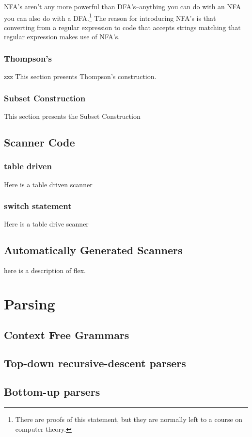 \documentclass[letterpaper,12pt,openany,reqno]{book}%
\begin{document}
NFA's aren't any more powerful than DFA's--anything you can do with an NFA you can also do with a DFA.\footnote{There are proofs of this statement, but they are normally left to a course on computer theory.} The reason for introducing NFA's is that converting from a regular expression to code that accepts strings matching that regular expression makes use of NFA's.

\section{Thompson's}

zzz
This section presents Thompson's construction.

\section{Subset Construction}

This section presents the Subset Construction

\chapter{Scanner Code}
\section{table driven}
Here is a table driven scanner
\section{switch statement}
Here is a table drive scanner

\chapter{Automatically Generated Scanners}
here is a description of flex.

\part{Parsing} \label{part.parser}
\chapter{Context Free Grammars}
\chapter {Top-down recursive-descent parsers}
\chapter {Bottom-up parsers}
\end{document}
